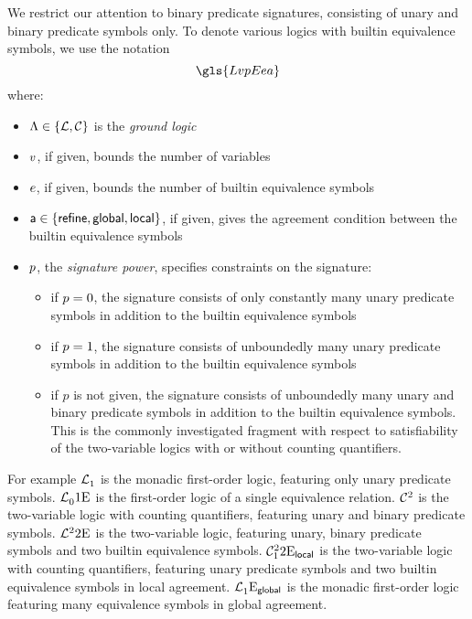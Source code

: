
We restrict our attention to binary predicate signatures, consisting of unary
and binary predicate symbols only.
To denote various logics with builtin equivalence symbols, we use the notation
\[
  \gls{LvpEea}
\]
where:
\begin{itemize}
  \item $\Lambda \in \left\{\mathcal{L}, \mathcal{C}\right\}$ is the \emph{ground logic}
  \item $v$, if given, bounds the number of variables
  \item $e$, if given, bounds the number of builtin equivalence symbols
  \item $\mathsf{a} \in \left\{\mathsf{refine}, \mathsf{global}, \mathsf{local}\right\}$, if given, gives the
  agreement condition between the builtin equivalence symbols
  \item $p$, the \emph{signature power}, specifies constraints on the
  signature:
  \begin{itemize}
    \item if $p = 0$, the signature consists of only constantly many unary
    predicate symbols in addition to the builtin equivalence symbols
    \item if $p = 1$, the signature consists of unboundedly many unary
    predicate symbols in addition to the builtin equivalence symbols
    \item if $p$ is not given, the signature consists of unboundedly many unary
    and binary predicate symbols in addition to the builtin equivalence symbols.
    This is the commonly investigated fragment with respect to satisfiability of
    the two-variable logics with or without counting quantifiers.
  \end{itemize}
\end{itemize}

For example $\mathcal{L}^{{}}_{1}$ is the monadic first-order logic, featuring only
unary predicate symbols.
$\mathcal{L}^{{}}_{0}{1}\mathrm{E}_{{}}$ is the first-order logic of a single equivalence
relation.
$\mathcal{C}^{2}_{{}}$ is the two-variable logic with counting quantifiers, featuring
unary and binary predicate symbols.
$\mathcal{L}^{2}_{{}}{2}\mathrm{E}_{{}}$ is the two-variable logic, featuring unary, binary
predicate symbols and two builtin equivalence symbols.
$\mathcal{C}^{2}_{1}{2}\mathrm{E}_{\mathsf{local}}$ is the two-variable logic with counting quantifiers,
featuring unary predicate symbols and two builtin equivalence symbols in local
agreement.
$\mathcal{L}^{{}}_{1}{{}}\mathrm{E}_{\mathsf{global}}$ is the monadic first-order logic featuring
many equivalence symbols in global agreement.

